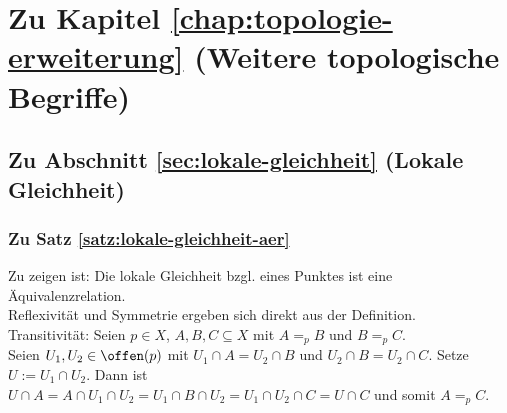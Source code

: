 \section{Zu Kapitel \ref{chap:topologie-erweiterung} (Weitere topologische Begriffe)}


\subsection{Zu Abschnitt \ref{sec:lokale-gleichheit} (Lokale Gleichheit)}


\subsubsection{Zu Satz \ref{satz:lokale-gleichheit-aer}}\label{anh:lokale-gleichheit-aer}
    Zu zeigen ist: Die lokale Gleichheit bzgl. eines Punktes ist eine Äquivalenzrelation.\\
    Reflexivität und Symmetrie ergeben sich direkt aus der Definition.\\
    Transitivität: Seien $p \in X$, $A, B, C \subseteq X$ mit $A =_p B$ und $B =_p C$.\\
    Seien $U_1, U_2 \in \offen(p)$ mit $U_1 \cap A = U_2 \cap B$ und $U_2 \cap B = U_2 \cap C$. Setze $U := U_1 \cap U_2$. Dann ist $U \cap A = A \cap U_1 \cap U_2 = U_1 \cap B \cap U_2 = U_1 \cap U_2 \cap C = U \cap C$ und somit $A =_p C$.
    

